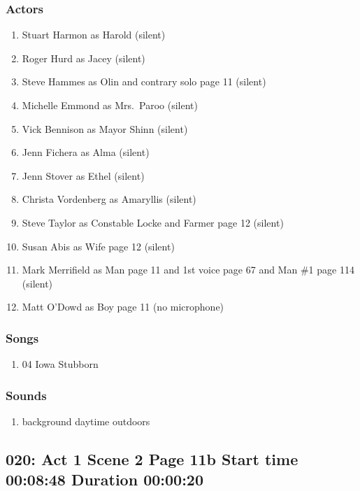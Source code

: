 \subsubsection{Actors}
\begin{enumerate}
\item Stuart Harmon as Harold (silent)
\item Roger Hurd as Jacey (silent)
\item Steve Hammes as Olin and contrary solo page 11 (silent)
\item Michelle Emmond as Mrs.~Paroo (silent)
\item Vick Bennison as Mayor Shinn (silent)
\item Jenn Fichera as Alma (silent)
\item Jenn Stover as Ethel (silent)
\item Christa Vordenberg as Amaryllis (silent)
\item Steve Taylor as Constable Locke and Farmer page 12 (silent)
\item Susan Abis as Wife page 12 (silent)
\item Mark Merrifield as Man page 11 and 1st voice page 67 and Man \#1 page 114 (silent)
\item Matt O'Dowd as Boy page 11 (no microphone)
\end{enumerate}

\subsubsection{Songs}
\begin{enumerate}
\item 04 Iowa Stubborn
\end{enumerate}\subsubsection{Sounds}
\begin{enumerate}
\item background daytime outdoors
\end{enumerate}
\subsection{020: Act 1 Scene 2 Page 11b Start time 00:08:48 Duration 00:00:20}

